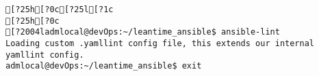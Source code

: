 \documentclass{scrartcl}
\begin{document}
\begin{Verbatim}
[?25h[?0c[?25l[?1c
[?25h[?0c
[?2004ladmlocal@devOps:~/leantime_ansible$ ansible-lint 
Loading custom .yamllint config file, this extends our internal yamllint config.
admlocal@devOps:~/leantime_ansible$ exit

\end{Verbatim}
\end{document}
